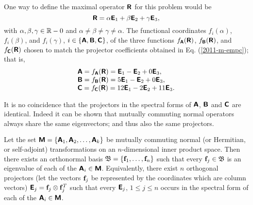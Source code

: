 {One way to define the  maximal operator  $\textsf{\textbf{R}}$ for this problem
would be
$$
\textsf{\textbf{R}} = \alpha \textsf{\textbf{E}}_1  + \beta \textsf{\textbf{E}}_2  + \gamma  \textsf{\textbf{E}}_3,
$$
with
$\alpha ,  \beta ,   \gamma \in {\Bbb R}-0$ and
$\alpha  \neq \beta  \neq   \gamma \neq \alpha  $.
The functional coordinates
$f_i(\alpha )$, $f_i(\beta)$, and $f_i(\gamma)$,
$i\in \{\textsf{\textbf{A}},\textsf{\textbf{B}},\textsf{\textbf{C}}\}$,  of the three functions
$ f_\textsf{\textbf{A}}(\textsf{\textbf{R}})$,
$ f_\textsf{\textbf{B}}(\textsf{\textbf{R}})$, and
$ f_\textsf{\textbf{C}}(\textsf{\textbf{R}})$
chosen to match the projector coefficients obtained in Eq. (\ref{2011-m-empc});
that is,
$$
\begin{array}{l}
\textsf{\textbf{A}}= f_\textsf{\textbf{A}}(\textsf{\textbf{R}})=  \textsf{\textbf{E}}_1  - \textsf{\textbf{E}}_2  + 0  \textsf{\textbf{E}}_3,\\
\textsf{\textbf{B}}=  f_\textsf{\textbf{B}}(\textsf{\textbf{R}})= 5\textsf{\textbf{E}}_1  - \textsf{\textbf{E}}_2  + 0 \textsf{\textbf{E}}_3,\\
\textsf{\textbf{C}}=  f_\textsf{\textbf{C}}(\textsf{\textbf{R}})= 12\textsf{\textbf{E}}_1  -2 \textsf{\textbf{E}}_2  + 11\textsf{\textbf{E}}_3.
\end{array}
$$
\eexample
}

It is no coincidence that the projectors in the spectral forms of
$\textsf{\textbf{A}}$,
$\textsf{\textbf{B}}$  and
$\textsf{\textbf{C}}$ are identical.
Indeed it can be shown that mutually commuting normal operators always share the same eigenvectors; and thus also the same projectors.

Let the set $\textsf{\textbf{M}}
=
\{
\textsf{\textbf{A}}_1,
\textsf{\textbf{A}}_2,
\ldots ,
\textsf{\textbf{A}}_k
\}
$
be mutually commuting  normal (or Hermitian, or self-adjoint) transformations on an $n$-dimensional inner product space.
Then there exists an orthonormal basis
${\frak B}= \{
{\bf f}_1,
\ldots ,
{\bf f}_n\}$
such that every ${\bf f}_j \in {\frak B}$  is an eigenvalue  of each of the $\textsf{\textbf{A}}_i \in  \textsf{\textbf{M}}$.
Equivalently, there exist $n$ orthogonal projectors  (let the vectors ${\bf f}_j$ be represented by the coordinates which are column vectors)
$\textsf{\textbf{E}}_j= {\bf f}_j\otimes {\bf f}_j^T$
such that every $\textsf{\textbf{E}}_j$, $1\le j\le n$ occurs in the spectral form of each of the $\textsf{\textbf{A}}_i \in  \textsf{\textbf{M}}$.



